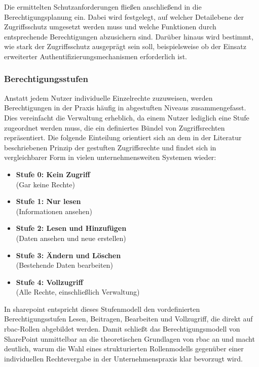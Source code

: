 Die ermittelten Schutzanforderungen fließen anschließend in die
Berechtigungsplanung ein. Dabei wird festgelegt, auf welcher Detailebene der
Zugriffsschutz umgesetzt werden muss und welche Funktionen durch entsprechende
Berechtigungen abzusichern sind. Darüber hinaus wird bestimmt, wie stark der
Zugriffsschutz ausgeprägt sein soll, beispielsweise ob der Einsatz erweiterter
Authentifizierungsmechanismen erforderlich ist. \cite{tsolkas2017rollen}

\subsubsection{Berechtigungsstufen}

Anstatt jedem Nutzer individuelle Einzelrechte zuzuweisen, werden Berechtigungen
in der Praxis häufig in abgestuften Niveaus zusammengefasst. Dies vereinfacht die
Verwaltung erheblich, da einem Nutzer lediglich eine Stufe zugeordnet werden muss,
die ein definiertes Bündel von Zugriffsrechten repräsentiert. Die folgende
Einteilung orientiert sich an dem in der Literatur beschriebenen Prinzip der
gestuften Zugriffsrechte und findet sich in vergleichbarer Form in vielen
unternehmensweiten Systemen wieder:
\cite{tsolkas2017rollen,sandhu1996rbac}

\begin{itemize}
    \item \textbf{Stufe 0: Kein Zugriff}   \\ (Gar keine Rechte)
    \item \textbf{Stufe 1: Nur lesen}       \\ (Informationen ansehen)
    \item \textbf{Stufe 2: Lesen und Hinzufügen} \\ (Daten ansehen und neue erstellen)
    \item \textbf{Stufe 3: Ändern und Löschen}   \\ (Bestehende Daten bearbeiten)
    \item \textbf{Stufe 4: Vollzugriff}     \\ (Alle Rechte, einschließlich Verwaltung)
\end{itemize}

In \gls{sharepoint} entspricht dieses Stufenmodell den vordefinierten Berechtigungsstufen
Lesen, Beitragen, Bearbeiten und Vollzugriff,
die direkt auf \acrshort{rbac}-Rollen abgebildet werden. Damit schließt das
Berechtigungsmodell von SharePoint unmittelbar an die theoretischen Grundlagen von
\acrshort{rbac} an und macht deutlich, warum die Wahl eines strukturierten Rollenmodells
gegenüber einer individuellen Rechtevergabe in der Unternehmenspraxis klar
bevorzugt wird.
\cite{tsolkas2017rollen,ferraiolo1992rbac}

